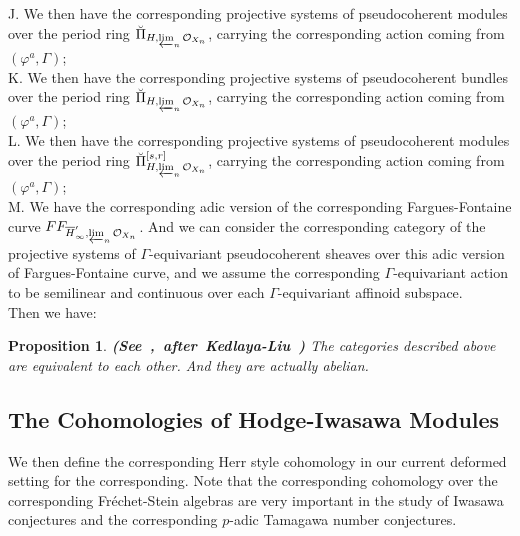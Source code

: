\documentclass[12pt]{amsart}
\newtheorem{proposition}[theorem]{Proposition}
\theoremstyle{definition}
\numberwithin{equation}{section}
\begin{document}
\noindent J. We then have the corresponding projective systems of pseudocoherent modules over the period ring ${\breve{\Pi}}_{H,\varprojlim_n\mathcal{O}_{X_n}}$, carrying the corresponding action coming from $(\varphi^a,\Gamma)$;\\
\noindent K. We then have the corresponding projective systems of pseudocoherent bundles over the period ring ${\breve{\Pi}}_{H,\varprojlim_n\mathcal{O}_{X_n}}$, carrying the corresponding action coming from $(\varphi^a,\Gamma)$;\\
\noindent L. We then have the corresponding projective systems of pseudocoherent modules over the period ring ${\breve{\Pi}}^{[s,r]}_{H,\varprojlim_n\mathcal{O}_{X_n}}$, carrying the corresponding action coming from $(\varphi^a,\Gamma)$;\\
\noindent M. We have the corresponding adic version of the corresponding Fargues-Fontaine curve $FF_{\overline{H}'_\infty,\varprojlim_n\mathcal{O}_{X_n}}$. And we can consider the corresponding category of the projective systems of $\Gamma$-equivariant pseudocoherent sheaves over this adic version of Fargues-Fontaine curve, and we assume the corresponding $\Gamma$-equivariant action to be semilinear and continuous over each $\Gamma$-equivariant affinoid subspace.\\

\indent Then we have:
\begin{proposition}\mbox{\bf{(See \cite[Theorem 4.11]{XT2}, after Kedlaya-Liu \cite[Theorem 5.9.6]{KL16})}}
The categories described above are equivalent to each other. And they are actually abelian.\\	
\end{proposition}










\subsection{The Cohomologies of Hodge-Iwasawa Modules}


\indent We then define the corresponding Herr style cohomology in our current deformed setting for the corresponding. Note that the corresponding cohomology over the corresponding Fr\'echet-Stein algebras are very important in the study of Iwasawa conjectures and the corresponding $p$-adic Tamagawa number conjectures.
\end{document}
